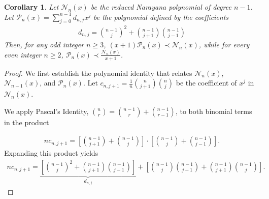 \documentclass[final,3p,times,12pt]{elsarticle}
\newtheorem{corollary}{Corollary}[section]
\numberwithin{equation}{section}  %
\begin{document}
\begin{corollary}Let $\mathcal{N}_n(x)$ be the reduced Narayana polynomial of degree $n-1$. Let $\mathcal{P}_n(x) = \sum_{j=0}^{n-1} d_{n,j} x^{j}$ be the polynomial defined by the coefficients
	\begin{align}\label{modified-naryana-coefficients}
		d_{n,j} = \binom{n-1}{j}^2 + \binom{n-1}{j+1}\binom{n-1}{j-1}
	\end{align}
	Then, for any odd integer $n \ge 3$, $(x+1)\mathcal{P}_n(x)\prec \mathcal{N}_n(x)$, while for every even integer $n \geq 2$, $\mathcal{P}_n(x)\prec \frac{\mathcal{N}_n(x)}{x+1}$.
\end{corollary}

\begin{proof}
	We first establish the polynomial identity that relates $\mathcal{N}_n(x)$, $\mathcal{N}_{n-1}(x)$, and $\mathcal{P}_n(x)$.
	Let $c_{n,j+1} = \frac{1}{n}\binom{n}{j+1}\binom{n}{j}$ be the coefficient of $x^{j}$ in $\mathcal{N}_n(x)$. 
	
	We apply Pascal’s Identity, $\binom{n}{r} = \binom{n-1}{r} + \binom{n-1}{r-1}$, to both binomial terms in the product
	
	\begin{align}
		n c_{n,j+1} = \left[ \binom{n-1}{j+1} + \binom{n-1}{j} \right] \cdot \left[ \binom{n-1}{j} + \binom{n-1}{j-1} \right].
	\end{align}
	Expanding this product yields 
	\begin{align}
		n c_{n,j+1} = \underbrace{\left[ \binom{n-1}{j}^2 + \binom{n-1}{j+1}\binom{n-1}{j-1} \right]}_{d_{n,j}} + \left[ \binom{n-1}{j}\binom{n-1}{j-1} + \binom{n-1}{j+1}\binom{n-1}{j} \right]. 
	\end{align}
	
	
	

\end{proof}
\end{document}
